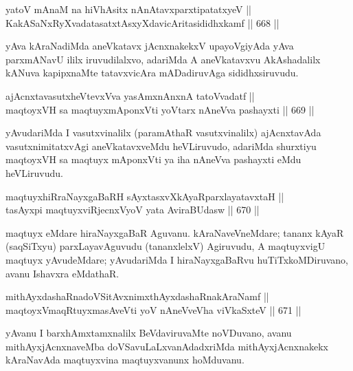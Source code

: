 
\begin{shl}
yatoV mAnaM na hiVhAsitx nAnAtavxparxtipatatxyeV || \\
KakASaNxRyXvadatasatxtAsxyXdavicAritasididhxkamf \hfill || 668 ||
\end{shl}

\begin{artha} 
yAva kAraNadiMda aneVkatavx jAcnxnakekxV upayoVgiyAda yAva parxmANavU 
ililx iruvudilalxvo, adariMda A aneVkatavxvu AkAshadalilx kANuva 
kapipxnaMte tatavxvicAra mADadiruvAga sididhxsiruvudu.
\end{artha}

\begin{shl}
ajAcnxtavasutxheVtevxVva yasAmxnAnxnA tatoV\s vadatf || \\
maqtoyxVH sa maqtuyxmAponxVti yoV\s tarx nAneVva pashayxti \hfill || 669 ||  
\end{shl}

\begin{artha} 
yAvudariMda I vasutxvinalilx (paramAthaR vasutxvinalilx) ajAcnxtavAda 
vasutxnimitatxvAgi aneVkatavxveMdu heVLiruvudo, adariMda shurxtiyu 
maqtoyxVH sa maqtuyx mAponxVti ya iha nAneVva pashayxti eMdu heVLiruvudu.
\end{artha}

\begin{shl}
maqtuyxhiRraNayxgaBaRH sAyxtasxvXkAyaRparxlayatavxtaH || \\
tasAyxpi maqtuyxviRjecnxVyoV yata AviraBUdasw \hfill || 670 ||  
\end{shl}

\begin{artha} 
maqtuyx eMdare hiraNayxgaBaR Aguvanu. kAraNaveVneMdare; tananx kAyaR 
(saqSiTxyu) parxLayavAguvudu (tananxlelxV) Agiruvudu, A maqtuyxvigU 
maqtuyx yAvudeMdare; yAvudariMda I hiraNayxgaBaRvu huTiTxkoMDiruvano, 
avanu Ishavxra eMdathaR.
\end{artha}

\begin{shl}
mithAyxdashaRnadoVSitAvxnimxthAyxdashaRnakAraNamf || \\
maqtoyxVmaqRtuyxmasAveVti yoV nAneVveVha viVkaSxteV \hfill || 671 ||  
\end{shl}

\begin{artha} 
yAvanu I barxhAmxtamxnalilx BeVdaviruvaMte noVDuvano, avanu 
mithAyxjAcnxnaveMba doVSavuLaLxvanAdadxriMda mithAyxjAcnxnakekx 
kAraNavAda maqtuyxvina maqtuyxvanunx hoMduvanu.
\end{artha}


